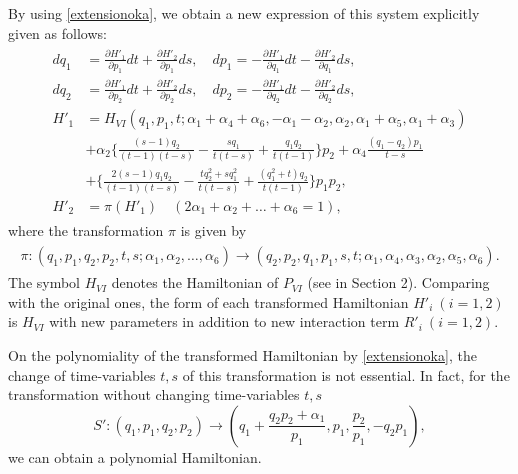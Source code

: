 By using \eqref{extensionoka}, we obtain a new expression of this system explicitly given as follows:
\begin{align}\label{uraS}
\begin{split}
dq_1&=\frac{\partial H'_1}{\partial p_1}dt+\frac{\partial H'_2}{\partial p_1}ds, \quad dp_1=-\frac{\partial H'_1}{\partial q_1}dt-\frac{\partial H'_2}{\partial q_1}ds,\\
dq_2&=\frac{\partial H'_1}{\partial p_2}dt+\frac{\partial H'_2}{\partial p_2}ds, \quad dp_2=-\frac{\partial H'_1}{\partial q_2}dt-\frac{\partial H'_2}{\partial q_2}ds,\\
H'_1 &=H_{VI}(q_1,p_1,t;\alpha_1+\alpha_4+\alpha_6,-\alpha_1-\alpha_2,\alpha_2,\alpha_1+\alpha_5,\alpha_1+\alpha_3)\\
&+\alpha_2\{\frac{(s-1)q_2}{(t-1)(t-s)}-\frac{sq_1}{t(t-s)}+\frac{q_1q_2}{t(t-1)}\}p_2+\alpha_4\frac{(q_1-q_2)p_1}{t-s}\\
&+\{\frac{2(s-1)q_1q_2}{(t-1)(t-s)}-\frac{tq_2^2+sq_1^2}{t(t-s)}+\frac{(q_1^2+t)q_2}{t(t-1)}\}p_1p_2,\\
H'_2 &=\pi(H'_1) \quad (2\alpha_1+\alpha_2+\dots+\alpha_6=1),
\end{split}
\end{align}
where the transformation $\pi$ is given by
\begin{align}
\begin{split}
\pi:(q_1,p_1,q_2,p_2,t,s;\alpha_1,\alpha_2, \dots ,\alpha_6) \rightarrow (q_2,p_2,q_1,p_1,s,t;\alpha_1,\alpha_4,\alpha_3,\alpha_2,\alpha_5,\alpha_6).
\end{split}
\end{align}
The symbol $H_{VI}$ denotes the Hamiltonian of $P_{VI}$ (see in Section 2). Comparing with the original ones, the form of each transformed Hamiltonian $H'_i \ (i=1,2)$ is $H_{VI}$ with new parameters in addition to new interaction term $R'_i \ (i=1,2)$.
\begin{rem} {\rm
On the polynomiality of the transformed Hamiltonian by \eqref{extensionoka}, the change of time-variables $t,s$ of this transformation is not essential. In fact, for the transformation without changing time-variables $t,s$
\begin{equation}
S':(q_1,p_1,q_2,p_2) \rightarrow \left(q_1+\frac{q_2p_2+\alpha_1}{p_1},p_1,\frac{p_2}{p_1},-q_2p_1\right),
\end{equation}
we can obtain a polynomial Hamiltonian.
\rm}
\end{rem}





